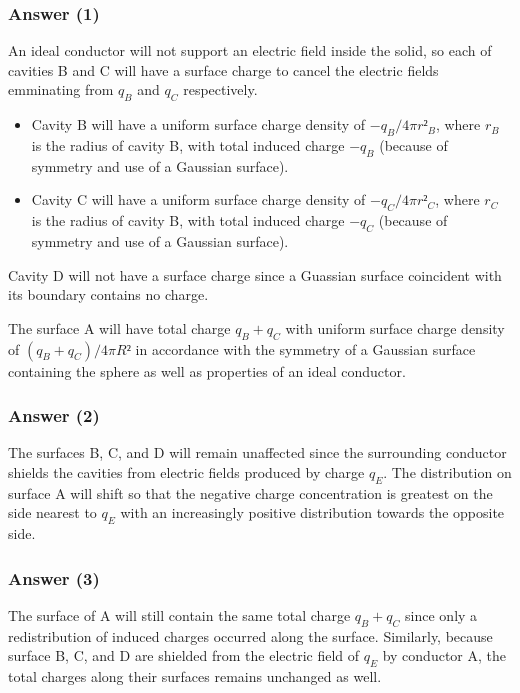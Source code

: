 \subsubsection{Answer (1)}
An ideal conductor will not support an electric field inside the solid, so each
of cavities B and C will have a surface charge to cancel the electric fields
emminating from $q_B$ and $q_C$ respectively.
\begin{itemize}
	\item
		Cavity B will have a uniform surface charge density of $-q_B/4πr²_B$,
		where $r_B$ is the radius of cavity B, with total induced charge $-q_B$
		(because of symmetry and use of a Gaussian surface).
	\item
		Cavity C will have a uniform surface charge density of $-q_C/4πr²_C$,
		where $r_C$ is the radius of cavity B, with total induced charge $-q_C$
		(because of symmetry and use of a Gaussian surface).
\end{itemize}
Cavity D will not have a surface charge since a Guassian surface coincident with
its boundary contains no charge.

The surface A will have total charge $q_B + q_C$ with uniform surface charge
density of $(q_B + q_C) / 4πR²$ in accordance with the symmetry of a Gaussian
surface containing the sphere as well as properties of an ideal conductor.

\subsubsection{Answer (2)}
The surfaces B, C, and D will remain unaffected since the surrounding conductor
shields the cavities from electric fields produced by charge $q_E$. The
distribution on surface A will shift so that the negative charge concentration
is greatest on the side nearest to $q_E$ with an increasingly positive
distribution towards the opposite side.

\subsubsection{Answer (3)}
The surface of A will still contain the same total charge $q_B + q_C$ since only
a redistribution of induced charges occurred along the surface. Similarly,
because surface B, C, and D are shielded from the electric field of $q_E$ by
conductor A, the total charges along their surfaces remains unchanged as well.

\clearpage

